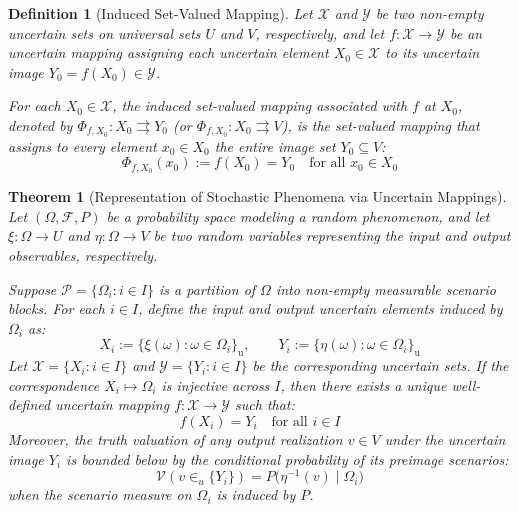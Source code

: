 \documentclass[a4paper,12pt, twoside]{memoir}
\newtheorem{definition}{Definition}[chapter]
\newtheorem{theorem}{Theorem}[chapter]
\newcommand{\tbd}[1]{\mathcal{#1}} %
\begin{document}
	\begin{definition}[Induced Set-Valued Mapping]
		Let $\tbd{X}$ and $\tbd{Y}$ be two non-empty uncertain sets on universal sets $U$ and $V$, respectively, and let $f : \tbd{X} \to \tbd{Y}$ be an uncertain mapping assigning each uncertain element $X_0 \in \tbd{X}$ to its uncertain image $Y_0 = f(X_0) \in \tbd{Y}$.
		
		For each $X_0 \in \tbd{X}$, the \emph{induced set-valued mapping} associated with $f$ at $X_0$, denoted by $\Phi_{f, X_0} : X_0 \rightrightarrows Y_0$ (or $\Phi_{f, X_0} : X_0 \rightrightarrows V$), is the set-valued mapping that assigns to every element $x_0 \in X_0$ the entire image set $Y_0 \subseteq V$:
		\[
		\Phi_{f, X_0}(x_0) := f(X_0) = Y_0 \quad \text{for all } x_0 \in X_0
		\]
	\end{definition}
	\begin{theorem}[Representation of Stochastic Phenomena via Uncertain Mappings]
		Let $(\Omega, \mathcal{F}, P)$ be a probability space modeling a random phenomenon, and let $\xi : \Omega \to U$ and $\eta : \Omega \to V$ be two random variables representing the input and output observables, respectively. 
		
		Suppose $\mathcal{P} = \{\Omega_i : i \in I\}$ is a partition of $\Omega$ into non-empty measurable scenario blocks. For each $i \in I$, define the input and output uncertain elements induced by $\Omega_i$ as:
		\[
		X_i := \big\{ \xi(\omega) : \omega \in \Omega_i \big\}_\mathrm{u}, \qquad Y_i := \big\{ \eta(\omega) : \omega \in \Omega_i \big\}_\mathrm{u}
		\]
		Let $\tbd{X} = \{X_i : i \in I\}$ and $\tbd{Y} = \{Y_i : i \in I\}$ be the corresponding uncertain sets. If the correspondence $X_i \mapsto \Omega_i$ is injective across $I$, then there exists a unique well-defined uncertain mapping $f : \tbd{X} \to \tbd{Y}$ such that:
		\[
		f(X_i) = Y_i \quad \text{for all } i \in I
		\]
		Moreover, the truth valuation of any output realization $v \in V$ under the uncertain image $Y_i$ is bounded below by the conditional probability of its preimage scenarios:
		\[
		\mathcal{V}(v \in_u \{Y_i\}) = P\big(\eta^{-1}(v) \mid \Omega_i\big)
		\]
		when the scenario measure on $\Omega_i$ is induced by $P$.
	\end{theorem}
\end{document}

